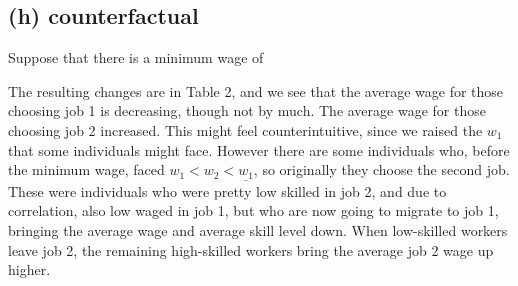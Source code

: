 \documentclass[12pt]{article}
\begin{document}
\subsection*{(h) counterfactual}
Suppose that there is a minimum wage of 

The resulting changes are in Table 2, and we see that the average wage for those choosing job 1 is decreasing, though not by much. The average wage for those choosing job 2 increased. This might feel counterintuitive, since we raised the $w_1$ that some individuals might face. However there are some individuals who, before the minimum wage, faced $w_1 < w_2 < \underline{w_1}$, so originally they choose the second job. These were individuals who were pretty low skilled in job 2, and due to correlation, also low waged in job 1, but who are now going to migrate to job 1, bringing the average wage and average skill level down. When low-skilled workers leave job 2, the remaining high-skilled workers bring the average job 2 wage up higher. 

\end{document}
